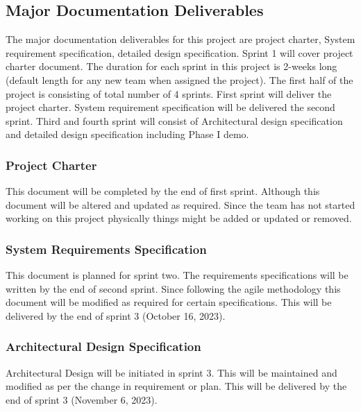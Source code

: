 
\subsection{Major Documentation Deliverables}
The major documentation deliverables for this project are project charter, System requirement specification, detailed design specification. Sprint 1 will cover project charter document. The duration for each sprint in this project is 2-weeks long (default length for any new team when assigned the project). The first half of the project is consisting of total number of 4 sprints. First sprint will deliver the project charter. System requirement specification will be delivered the second sprint. Third and fourth sprint will consist of Architectural design specification and detailed design specification including Phase I demo. 

\subsubsection{Project Charter}
This document will be completed by the end of first sprint. Although this document will be altered and updated as required. Since the team has not started working on this project physically things might be added or updated or removed.  


\subsubsection{System Requirements Specification}
This document is planned for sprint two. The requirements specifications will be written by the end of second sprint. Since following the agile methodology this document will be modified as required for certain specifications. This will be delivered by the end of sprint 3 (October 16, 2023). 

\subsubsection{Architectural Design Specification}
Architectural Design will be initiated in sprint 3. This will be maintained and modified as per the change in requirement or plan. This will be delivered by the end of sprint 3 (November 6, 2023). 


